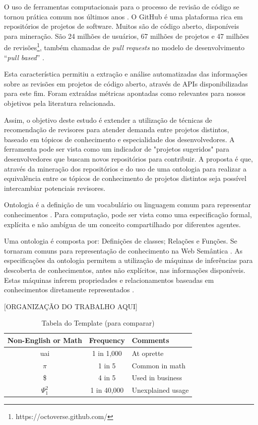 \documentclass[sigconf]{acmart}
\begin{document}
O uso de ferramentas computacionais para o processo de revisão de código se tornou prática comum nos últimos anos \cite{Bacchelli2013}. O GitHub é uma plataforma rica em repositórios de projetos de software. Muitos são de código aberto, disponíveis para mineração. São 24 milhões de usuários, 67 milhões de projetos e 47 milhões de revisões\footnote{https://octoverse.github.com/}, também chamadas de \textit{pull requests} no modelo de desenvolvimento ``\textit{pull based}'' \cite{gousios2014}.

Esta característica permitiu a extração e análise automatizadas das informações sobre as revisões em projetos de código aberto, através de APIs disponibilizadas para este fim. Foram extraídas métricas apontadas como relevantes para nossos objetivos pela literatura relacionada.

Assim, o objetivo deste estudo é extender a utilização de técnicas de recomendação de revisores para atender demanda entre projetos distintos, baseado em tópicos de conhecimento e especialidade dos desenvolvedores. A ferramenta pode ser vista como um indicador de "projetos sugeridos" para desenvolvedores que buscam novos repositórios para contribuir. A proposta é que, através da mineração dos repositórios e do uso de uma ontologia para realizar a equivalência entre os tópicos de conhecimento de projetos distintos seja possível intercambiar potenciais revisores.

Ontologia é a definição de um vocabulário ou linguagem comum para representar conhecimentos \cite{guarino1998}. Para computação, pode ser vista como uma especificação formal, explícita e não ambígua de um conceito compartilhado por diferentes agentes.

Uma ontologia é composta por: Definições de classes; Relações e Funções. Se tornaram comuns para representação de conhecimento na Web Semântica \cite{berners2001}. As especificações da ontologia permitem a utilização de máquinas de inferências para descoberta de conhecimentos, antes não explícitos, nas informações disponíveis. Estas máquinas inferem propriedades e relacionamentos baseadas em conhecimentos diretamente representados \cite{berners2001}.


[ORGANIZAÇÃO DO TRABALHO AQUI]
\begin{table}
  \caption{Tabela do Template (para comparar)}
  \label{tab:freq}
  \begin{tabular}{ccl}
    \toprule
    Non-English or Math&Frequency&Comments\\
    \midrule
    uai & 1 in 1,000 &  At oprette }\\
    $\pi$ & 1 in 5& Common in math\\
    \$ & 4 in 5 & Used in business\\
    $\Psi^2_1$ & 1 in 40,000& Unexplained usage\\
  \bottomrule
\end{tabular}
\end{table}
\end{document}
